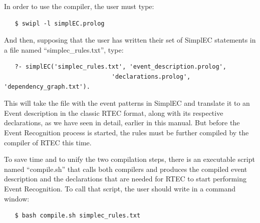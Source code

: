 In order to use the compiler, the user must type:
{\small
\begin{verbatim}
   $ swipl -l simplEC.prolog
\end{verbatim}
}

And then, supposing that the user has written their set of SimplEC statements in a file named ``simplec\_rules.txt'', type:
{\small
\begin{verbatim}
   ?- simplEC('simplec_rules.txt', 'event_description.prolog',
                              'declarations.prolog', 'dependency_graph.txt').
\end{verbatim}
}
This will take the file with the event patterns in SimplEC and translate it to an Event description in the classic RTEC format, along with its respective declarations, as we have seen in detail, earlier in this manual. But before the Event Recognition process is started, the rules must be further compiled by the compiler of RTEC this time.

To save time and to unify the two compilation steps, there is an executable script named ``compile.sh'' that calls both compilers and produces the compiled event description and the declarations that are needed for RTEC to start performing Event Recognition. To call that script, the user should write in a command window:
{\small
\begin{verbatim}
   $ bash compile.sh simplec_rules.txt
\end{verbatim}
}
